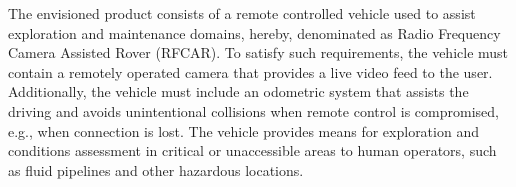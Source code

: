 The envisioned product consists of a remote controlled vehicle used to assist
exploration and maintenance domains, hereby, denominated as Radio Frequency
Camera Assisted Rover (RFCAR). To satisfy such requirements, the vehicle must
contain a remotely operated camera that provides a live video feed to the user.
Additionally, the vehicle must include an odometric system that assists the
driving and avoids unintentional collisions when remote control is compromised, e.g., when connection is lost.
The vehicle provides means for exploration and conditions assessment in critical
or unaccessible areas to human operators, such as fluid pipelines and other hazardous locations.
%
